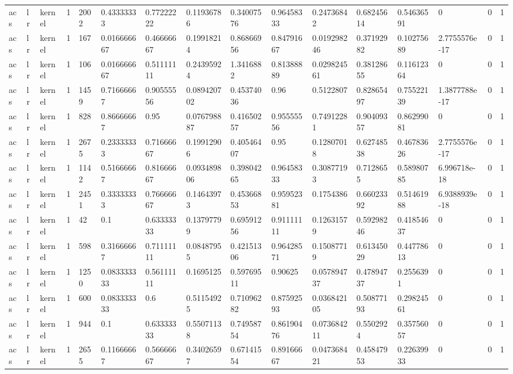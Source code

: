 \begin{tabular}{llllllllllllllll}
acs & lr & kernel & 1 & 2002 & 0.43333333 & 0.77222222 & 0.11936786 & 0.34007576 & 0.96458333 & 0.24736842 & 0.68245614 & 0.54636591 & 0 & 0 & 1 \\
acs & lr & kernel & 1 & 167 & 0.016666667 & 0.46666667 & 0.19918214 & 0.86866956 & 0.84791667 & 0.019298246 & 0.37192982 & 0.10275689 & 2.7755576e-17 & 0 & 1 \\
acs & lr & kernel & 1 & 106 & 0.016666667 & 0.51111111 & 0.24395924 & 1.3416882 & 0.81388889 & 0.029824561 & 0.38128655 & 0.11612364 & 0 & 0 & 1 \\
acs & lr & kernel & 1 & 1459 & 0.71666667 & 0.90555556 & 0.089420702 & 0.45374036 & 0.96 & 0.5122807 & 0.82865497 & 0.75522139 & 1.3877788e-17 & 0 & 1 \\
acs & lr & kernel & 1 & 828 & 0.86666667 & 0.95 & 0.076798887 & 0.41650257 & 0.95555556 & 0.74912281 & 0.90409357 & 0.86299081 & 0 & 0 & 1 \\
acs & lr & kernel & 1 & 2675 & 0.23333333 & 0.71666667 & 0.19912906 & 0.40546407 & 0.95 & 0.12807018 & 0.62748538 & 0.46783626 & 2.7755576e-17 & 0 & 1 \\
acs & lr & kernel & 1 & 1142 & 0.51666667 & 0.81666667 & 0.093489806 & 0.39804265 & 0.96458333 & 0.30877193 & 0.7128655 & 0.58980785 & 6.996718e-18 & 0 & 1 \\
acs & lr & kernel & 1 & 2451 & 0.33333333 & 0.76666667 & 0.14643973 & 0.45366853 & 0.95952381 & 0.1754386 & 0.66023392 & 0.51461988 & 6.9388939e-18 & 0 & 1 \\
acs & lr & kernel & 1 & 42 & 0.1 & 0.63333333 & 0.13797799 & 0.69591256 & 0.91111111 & 0.12631579 & 0.59298246 & 0.41854637 & 0 & 0 & 1 \\
acs & lr & kernel & 1 & 598 & 0.31666667 & 0.71111111 & 0.08487955 & 0.42151306 & 0.96428571 & 0.15087719 & 0.61345029 & 0.44778613 & 0 & 0 & 1 \\
acs & lr & kernel & 1 & 1250 & 0.083333333 & 0.56111111 & 0.1695125 & 0.59769511 & 0.90625 & 0.057894737 & 0.47894737 & 0.2556391 & 0 & 0 & 1 \\
acs & lr & kernel & 1 & 600 & 0.083333333 & 0.6 & 0.51154925 & 0.71096282 & 0.87592593 & 0.036842105 & 0.50877193 & 0.29824561 & 0 & 0 & 1 \\
acs & lr & kernel & 1 & 944 & 0.1 & 0.63333333 & 0.55071138 & 0.74958754 & 0.86190476 & 0.073684211 & 0.5502924 & 0.35756057 & 0 & 0 & 1 \\
acs & lr & kernel & 1 & 2655 & 0.11666667 & 0.56666667 & 0.34026597 & 0.67141554 & 0.89166667 & 0.047368421 & 0.45847953 & 0.22639933 & 0 & 0 & 1 \\

\end{tabular}
